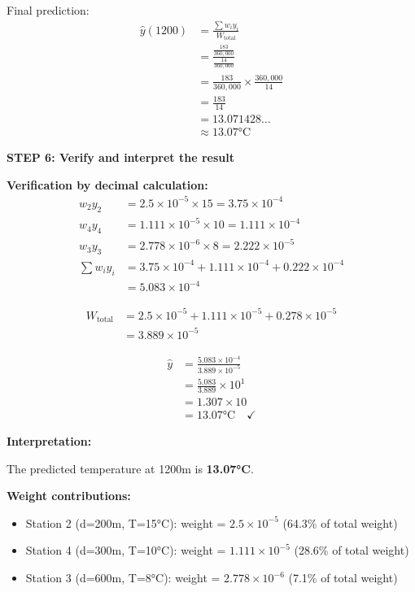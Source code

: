 \documentclass[12pt]{article}
\begin{document}
\begin{solution}
Final prediction:
\begin{align*}
\hat{y}(1200) &= \frac{\sum w_i y_i}{W_{\text{total}}} \\
&= \frac{\frac{183}{360{,}000}}{\frac{14}{360{,}000}} \\
&= \frac{183}{360{,}000} \times \frac{360{,}000}{14} \\
&= \frac{183}{14} \\
&= 13.071428\ldots \\
&\approx \boxed{13.07°\text{C}}
\end{align*}

\textbf{STEP 6: Verify and interpret the result}

\textbf{Verification by decimal calculation:}
\begin{align*}
w_2 y_2 &= 2.5 \times 10^{-5} \times 15 = 3.75 \times 10^{-4} \\
w_4 y_4 &= 1.111 \times 10^{-5} \times 10 = 1.111 \times 10^{-4} \\
w_3 y_3 &= 2.778 \times 10^{-6} \times 8 = 2.222 \times 10^{-5} \\
\hline
\sum w_i y_i &= 3.75 \times 10^{-4} + 1.111 \times 10^{-4} + 0.222 \times 10^{-4} \\
&= 5.083 \times 10^{-4}
\end{align*}

\begin{align*}
W_{\text{total}} &= 2.5 \times 10^{-5} + 1.111 \times 10^{-5} + 0.278 \times 10^{-5} \\
&= 3.889 \times 10^{-5}
\end{align*}

\begin{align*}
\hat{y} &= \frac{5.083 \times 10^{-4}}{3.889 \times 10^{-5}} \\
&= \frac{5.083}{3.889} \times 10^{1} \\
&= 1.307 \times 10 \\
&= 13.07°\text{C} \quad \checkmark
\end{align*}

\textbf{Interpretation:}

The predicted temperature at 1200m is \textbf{13.07°C}.

\textbf{Weight contributions:}
\begin{itemize}
    \item Station 2 (d=200m, T=15°C): weight = \(2.5 \times 10^{-5}\) (64.3\% of total weight)
    \item Station 4 (d=300m, T=10°C): weight = \(1.111 \times 10^{-5}\) (28.6\% of total weight)
    \item Station 3 (d=600m, T=8°C): weight = \(2.778 \times 10^{-6}\) (7.1\% of total weight)
\end{itemize}


\end{solution}
\end{document}
